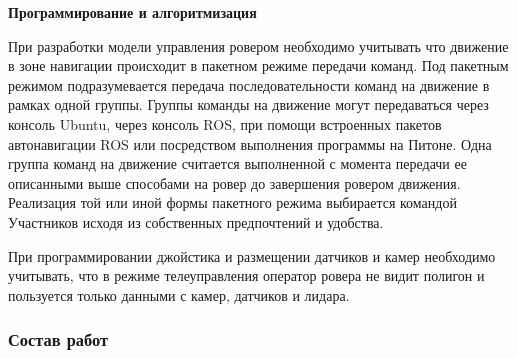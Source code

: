 \textbf{Программирование и алгоритмизация}

При разработки модели управления ровером необходимо учитывать что движение в зоне навигации происходит в пакетном режиме передачи команд. Под пакетным режимом подразумевается передача последовательности команд на движение в рамках одной группы. Группы команды на движение могут передаваться через консоль Ubuntu, через консоль ROS, при помощи встроенных пакетов автонавигации ROS или посредством выполнения программы на Питоне. Одна группа команд на движение считается выполненной с момента передачи ее описанными выше способами на ровер до завершения ровером движения.  Реализация той или иной формы пакетного режима выбирается командой Участников исходя из собственных предпочтений и удобства.

При программировании джойстика и размещении датчиков и камер необходимо учитывать, что в режиме телеуправления оператор ровера не видит полигон и пользуется только данными с камер, датчиков и лидара.

\subsubsection*{Состав работ}

